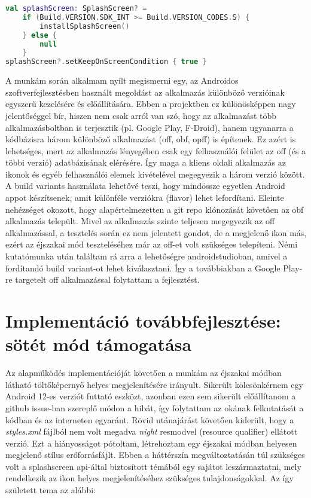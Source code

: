 \begin{lstlisting}[frame=single, language=Kotlin, caption=A \gls{splashscreen} compat könyvtár
    segítségével visszafele kompatibilitást támogató kódrészlet]
val splashScreen: SplashScreen? =
    if (Build.VERSION.SDK_INT >= Build.VERSION_CODES.S) {
        installSplashScreen()
    } else {
        null
    }
splashScreen?.setKeepOnScreenCondition { true }
\end{lstlisting}


A munkám során alkalmam nyílt megismerni egy, az Androidos szoftverfejlesztésben használt
megoldást az alkalmazás különböző verzióinak egyszerű kezelésére és előállítására. Ebben a projektben ez
különösképpen nagy jelentőséggel bír, hiszen nem csak arról van szó, hogy az alkalmazást több
alkalmazásboltban is terjesztik (pl. Google Play, F-Droid), hanem ugyanarra a kódbázisra
három különböző alkalmazást (\acrfull{off}, \acrfull{obf}, \acrfull{opff})
is építenek. Ez azért is lehetséges, mert az alkalmazás lényegében csak egy felhasználói felület
az \acrlong{off} (és a többi verzió) adatbázisának elérésére. Így maga a kliens oldali alkalmazás
az ikonok és egyéb felhasználói elemek kivételével megegyezik a három verzió között.
A build variants használata lehetővé teszi, hogy mindössze egyetlen Android appot
készítsenek, amit különféle verziókra (flavor) lehet lefordítani. Eleinte nehézséget okozott,
hogy alapértelmezetten a \Gls{git} \gls{repo} klónozását követően az \acrlong{obf} alkalmazás
települt. Mivel az alkalmazás szinte teljesen megegyezik az \acrlong{off} alkalmazással, a
tesztelés során ez nem jelentett gondot, de a  megjelenő ikon más, ezért az éjszakai
mód teszteléséhez már az \acrlong{off}-et volt szükséges telepíteni. Némi kutatómunka után
találtam rá arra a lehetőségre \gls{androidstudio}ban, amivel a fordítandó build variant-ot lehet
kiválasztani. Így a továbbiakban a Google Play-re targetelt \acrlong{off} alkalmazással
folytattam a fejlesztést.

\section{Implementáció továbbfejlesztése: sötét mód támogatása}
Az alapműködés implementációját követően a munkám az éjszakai módban látható töltőképernyő helyes megjelenítésére irányult.
Sikerült kölcsönkérnem egy Android 12-es verziót futtató eszközt, azonban ezen sem sikerült
előállítanom a \gls{github} issue-ban \cite{issue} szereplő módon a hibát, így folytattam az okának felkutatását
a kódban és az interneten egyaránt. Rövid utánajárást követően kiderült, hogy a
\textit{styles.xml} fájlból nem volt megadva \textit{night} \gls{resmod}vel
(resource qualifier) ellátott verzió. Ezt a hiányosságot pótoltam, létrehoztam egy éjszakai
módban helyesen megjelenő stílus erőforrásfájlt. Ebben a háttérszín megváltoztatásán túl szükséges
volt a \gls{splashscreen} \acrshort{api}-által biztosított témából egy sajátot leszármaztatni, mely rendelkezik
az ikon helyes megjelenítéséhez szükséges tulajdonságokkal. Az így született \gls{tema} az alábbi:

